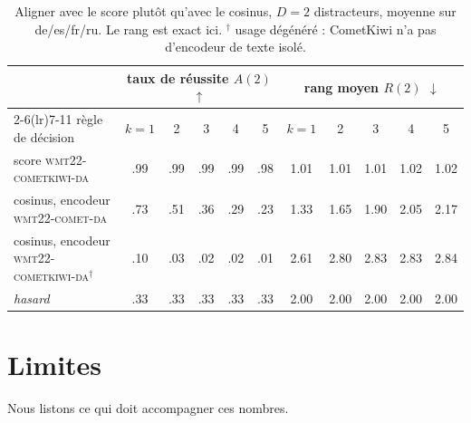 \documentclass[11pt]{article}
\newcommand{\cometda}{\textsc{wmt22-comet-da}}
\newcommand{\kiwi}{\textsc{wmt22-cometkiwi-da}}
\begin{document}
\begin{table}[t]
\centering\small
\begin{tabular}{l ccccc ccccc}
\toprule
& \multicolumn{5}{c}{taux de réussite $A(2)$ $\uparrow$} & \multicolumn{5}{c}{rang moyen $R(2)$ $\downarrow$}\\
\cmidrule(lr){2-6}\cmidrule(lr){7-11}
règle de décision & $k{=}1$ & 2 & 3 & 4 & 5 & $k{=}1$ & 2 & 3 & 4 & 5\\
\midrule
score \kiwi{}                  & .99 & .99 & .99 & .99 & .98 & 1.01 & 1.01 & 1.01 & 1.02 & 1.02\\
cosinus, encodeur \cometda{}   & .73 & .51 & .36 & .29 & .23 & 1.33 & 1.65 & 1.90 & 2.05 & 2.17\\
cosinus, encodeur \kiwi{}$^\dagger$ & .10 & .03 & .02 & .02 & .01 & 2.61 & 2.80 & 2.83 & 2.83 & 2.84\\
\midrule
\emph{hasard} & .33 & .33 & .33 & .33 & .33 & 2.00 & 2.00 & 2.00 & 2.00 & 2.00\\
\bottomrule
\end{tabular}
\caption{Aligner avec le score plutôt qu'avec le cosinus, $D=2$ distracteurs, moyenne sur de/es/fr/ru. Le rang est exact ici. $^\dagger$ usage dégénéré : CometKiwi n'a pas d'encodeur de texte isolé.}
\label{tab:comet}
\end{table}

\section{Limites}

Nous listons ce qui doit accompagner ces nombres.
\end{document}
